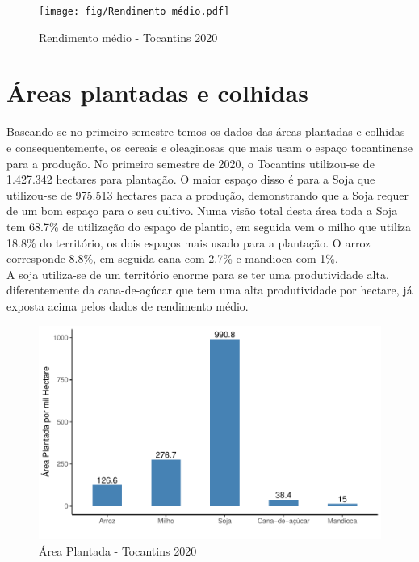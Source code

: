 \begin{figure}[h]
	\caption{Rendimento médio - Tocantins 2020}
	\texttt{[image: fig/Rendimento médio.pdf]}
\end{figure}

\section{Áreas plantadas e colhidas}

\par Baseando-se no primeiro semestre temos os dados das áreas plantadas e colhidas e consequentemente, os cereais e oleaginosas que mais usam o espaço tocantinense para a produção. No primeiro semestre de 2020, o Tocantins utilizou-se de 1.427.342 hectares para plantação. O maior espaço disso é para a Soja que utilizou-se de 975.513 hectares para a produção, demonstrando que a Soja requer de um bom espaço para o seu cultivo. Numa visão total desta área toda a Soja tem 68.7\% de utilização do espaço de plantio, em seguida vem o milho que utiliza 18.8\% do território, os dois espaços mais usado para a plantação. O arroz corresponde 8.8\%, em seguida cana com 2.7\% e mandioca com 1\%.
\\
A soja utiliza-se de um território enorme para se ter uma produtividade alta, diferentemente da cana-de-açúcar que tem uma alta produtividade por hectare, já exposta acima pelos dados de rendimento médio.
\begin{figure}[h]
	\caption{Área Plantada - Tocantins 2020}
	\includegraphics[width=\linewidth]{fig/Area Plantada.pdf}
\end{figure}

